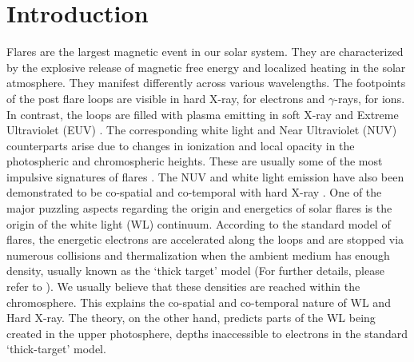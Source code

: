 \justifying

\section{Introduction} \label{sec:intro}

Flares are the largest magnetic event in our solar system. They are characterized by the explosive release of magnetic free energy and localized heating in the solar atmosphere. They manifest differently across various wavelengths. The footpoints of the post flare loops are visible in hard X-ray, for electrons and $\gamma$-rays, for ions. In contrast, the loops are filled with plasma emitting in soft X-ray and Extreme Ultraviolet (EUV) \citep{fletcher11}. The corresponding white light and Near Ultraviolet (NUV) counterparts arise due to changes in ionization and local opacity in the photospheric and chromospheric heights. These are usually some of the most impulsive signatures of flares \citep{watanabe17,hudson06}. The NUV and white light emission have also been demonstrated to be co-spatial and co-temporal with hard X-ray \citep{hudson92, oliverso12}. One of the major puzzling aspects regarding the origin and energetics of solar flares is the origin of the white light (WL) continuum. According to the standard model of flares, the energetic electrons are accelerated along the loops and are stopped via numerous collisions and thermalization when the ambient medium has enough density, usually known as the `thick target' model (For further details, please refer to \cite{brown73,benz17,fletcher11}). We usually believe that these densities are reached within the chromosphere. This explains the co-spatial and co-temporal nature of WL and Hard X-ray. The theory, on the other hand, predicts parts of the WL being created in the upper photosphere, depths inaccessible to electrons in the standard `thick-target' model. 


